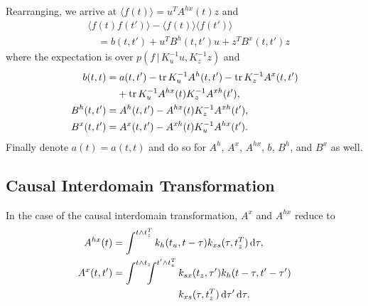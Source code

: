 \documentclass{article}
\newcommand{\tr}{\operatorname{tr}}
\newcommand{\id}[1]{\, \mathrm{d} #1}     %
\newcommand{\cond}{\, | \,}               %
\newcommand{\la}{\langle}
\newcommand{\ra}{\rangle}
\newcommand{\phan}[1]{\hphantom{#1\;}}
\begin{document}
Rearranging, we arrive at $\la f(t) \ra = u^T  A^{hx}(t) z$ and
\begin{align*}
    &\la f(t) f(t') \ra - \la f(t) \ra \la f(t') \ra \\
    &\quad = b(t,t') + u^T B^{h}(t,t') u + z^T B^{x}(t,t') z
\end{align*}
where the expectation is over $p(f\cond K_u^{-1} u, K_z^{-1} z)$ and
\begin{align*}
    b(t,t) &= a(t,t') - \tr K_u^{-1} A^{h}(t,t') - \tr K_z^{-1}A^{x}(t,t') \\
    &\phan{=} + \tr K_u^{-1}A^{hx}(t)K_z^{-1}A^{xh}(t'), \\
    B^{h}(t,t') &= A^{h}(t,t') - A^{hx}(t)K_z^{-1} A^{xh}(t'), \\
    B^{x}(t,t') &= A^{x}(t,t') - A^{xh}(t)K_u^{-1} A^{hx}(t').
\end{align*}
Finally denote $a(t)=a(t,t)$ and do so for $A^h$, $A^x$, $A^{hx}$, $b$, $B^h$, and $B^x$ as well.

\subsection{Causal Interdomain Transformation}
In the case of the causal interdomain transformation, $A^x$ and $A^{hx}$ reduce to
\begin{align*}
   A^{hx}(t) &=\int^{t\land t_z^T} k_h(t_u,t-\tau) k_{xs}(\tau, t_z^T) \id{ \tau}, \\
   A^{x}(t,t')&=\int^{t \land t_z}\!\!\!\!\int^{t'\land t_z^T} k_{sx}(t_z, \tau') k_h(t- \tau,t'-\tau') \\
    &\phan{=\int^{t \land t_z}\!\!\!\!\int^{t'\land t_z^T}}\, k_{xs}(\tau, t_z^T) \id{\tau'}\id{\tau}.
\end{align*}
\end{document}
